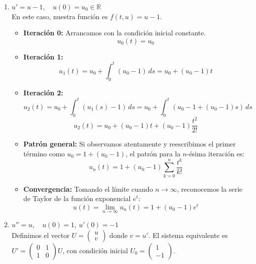 {    \begin{enumerate} [label=\alph*)]
        \item  $u' = u - 1, \quad u(0) = u_0 \in \mathbb{R}$\\
            En este caso, nuestra función es $f(t, u) = u - 1$.
            \begin{itemize}
                \item \textbf{Iteración 0:} Arrancamos con la condición inicial constante.
                $$u_0(t) = u_0$$
                \item \textbf{Iteración 1:}
                $$u_1(t) = u_0 + \int_0^t (u_0 - 1) \, ds = u_0 + (u_0 - 1)t$$
                \item \textbf{Iteración 2:}
                $$u_2(t) = u_0 + \int_0^t (u_1(s) - 1) \, ds = u_0 + \int_0^t \left(u_0 - 1 + (u_0 - 1)s\right) \, ds$$
                $$u_2(t) = u_0 + (u_0 - 1)t + (u_0 - 1)\frac{t^2}{2!}$$
                \item \textbf{Patrón general:} Si observamos atentamente y reescribimos el primer término como $u_0 = 1 + (u_0 - 1)$, el patrón para la $n$-ésima iteración es:
                $$u_n(t) = 1 + (u_0 - 1) \sum_{k=0}^n \frac{t^k}{k!}$$
                \item \textbf{Convergencia:} Tomando el límite cuando $n \to \infty$, reconocemos la serie de Taylor de la función exponencial $e^t$:
                $$u(t) = \lim_{n \to \infty} u_n(t) = 1 + (u_0 - 1)e^t$$
            \end{itemize}  
        \item $u'' = u, \quad u(0) = 1, \ u'(0) = -1$ \\
            Definimos el vector $U = \begin{pmatrix} u \\ v \end{pmatrix}$ donde $v = u'$. El sistema equivalente es $U' = \begin{pmatrix} 0 & 1 \\ 1 & 0 \end{pmatrix} U$, con condición inicial $U_0 = \begin{pmatrix} 1 \\ -1 \end{pmatrix}$.


\end{enumerate}}
